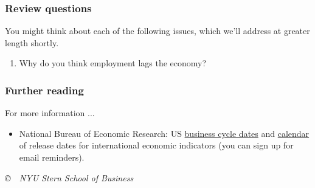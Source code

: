 \documentclass[letterpaper,12pt]{article}
\begin{document}
\subsubsection*{Review questions}

You might think about each of the following issues, which we'll
address at greater length shortly.
\begin{enumerate}

\item Why do you think employment lags the economy?

\end{enumerate}


\subsubsection*{Further reading}

For more information ...
%
\begin{itemize}
\item National Bureau of Economic Research: US
\href{http://www.nber.org/cycles.html/}{business cycle dates} and
\href{http://www.nber.org/releases/}{calendar} of release dates
for international economic indicators (you can sign up for email
reminders).

\end{itemize}


\vfill \centerline{\it \copyright \ \number\year \ NYU Stern
School of Business}
\end{document}
